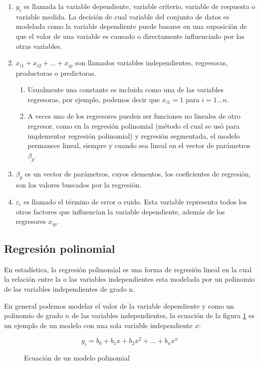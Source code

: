 \begin{enumerate}
	\item $y_i$ es llamada la variable dependiente, variable criterio, variable de respuesta o variable medida. La decisión de cual variable del conjunto de datos es modelada como la variable dependiente puede basarse en una suposición de que el valor de una variable es causado o directamente influenciado por las otras variables.
	
	\item $x_{i1} + x_{i2}+...+x_{ip}$ son llamados variables independientes, regresoras, productoras o predictoras.
	\begin{enumerate}
		\item Usualmente una constante es incluida como una de las variables regresoras, por ejemplo, podemos decir que $x_{i1} = 1$ para  $i =1...n$.
		\item A veces uno de los regresores pueden ser funciones no lineales de otro regresor, como en la regresión polinomial (método el cual se usó para implementar regresión polinomial) y regresión segmentada, el modelo permanece lineal, siempre y cuando sea lineal en el vector de parámetros $\beta_p$.
	\end{enumerate}
	\item $\beta_p$ es un vector de parámetros, cuyos elementos, los coeficientes de regresión, son los valores buscados por la regresión.
	\item $\varepsilon_i$ es llamado el término de error o ruido. Esta variable representa todos los otros factores que influencian la variable dependiente, además de los regresores $x_{ip}$.
\end{enumerate}
\subsection{Regresión polinomial}

En estadística, la regresión polinomial es una forma de regresión lineal en la cual la relación entre la o las variables independientes esta modelada por un polinomio de las variables independientes de grado n.

En general podemos modelar el valor de la variable dependiente y como un polinomio de grado $n$ de las variables independientes, la ecuación de la figura \ref{ec:regresionPolinomial} es un ejemplo de un modelo con una sola variable independiente $x$:
 
\begin{figure}
\[ y_i=b_0 + b_1x + b_2x^{2}+...+b_nx^{n} \]
\caption{Ecuación de un modelo polinomial}
\label{ec:regresionPolinomial}
\end{figure}

